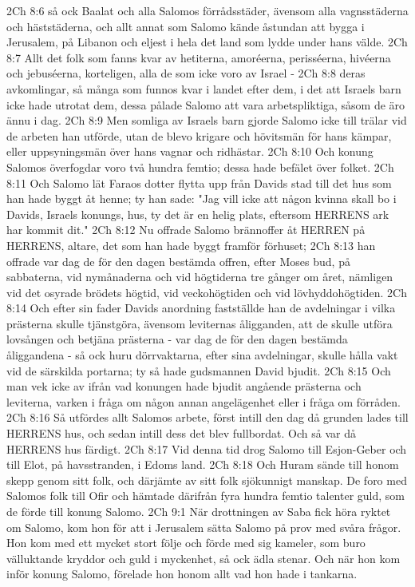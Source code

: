 2Ch 8:6  så ock Baalat och alla Salomos förrådsstäder, ävensom alla vagnsstäderna och häststäderna, och allt annat som Salomo kände åstundan att bygga i Jerusalem, på Libanon och eljest i hela det land som lydde under hans välde.
2Ch 8:7  Allt det folk som fanns kvar av hetiterna, amoréerna, perisséerna, hivéerna och jebuséerna, korteligen, alla de som icke voro av Israel -
2Ch 8:8  deras avkomlingar, så många som funnos kvar i landet efter dem, i det att Israels barn icke hade utrotat dem, dessa pålade Salomo att vara arbetspliktiga, såsom de äro ännu i dag.
2Ch 8:9  Men somliga av Israels barn gjorde Salomo icke till trälar vid de arbeten han utförde, utan de blevo krigare och hövitsmän för hans kämpar, eller uppsyningsmän över hans vagnar och ridhästar.
2Ch 8:10  Och konung Salomos överfogdar voro två hundra femtio; dessa hade befälet över folket.
2Ch 8:11  Och Salomo lät Faraos dotter flytta upp från Davids stad till det hus som han hade byggt åt henne; ty han sade: "Jag vill icke att någon kvinna skall bo i Davids, Israels konungs, hus, ty det är en helig plats, eftersom HERRENS ark har kommit dit."
2Ch 8:12  Nu offrade Salomo brännoffer åt HERREN på HERRENS, altare, det som han hade byggt framför förhuset;
2Ch 8:13  han offrade var dag de för den dagen bestämda offren, efter Moses bud, på sabbaterna, vid nymånaderna och vid högtiderna tre gånger om året, nämligen vid det osyrade brödets högtid, vid veckohögtiden och vid lövhyddohögtiden.
2Ch 8:14  Och efter sin fader Davids anordning fastställde han de avdelningar i vilka prästerna skulle tjänstgöra, ävensom leviternas åligganden, att de skulle utföra lovsången och betjäna prästerna - var dag de för den dagen bestämda åliggandena - så ock huru dörrvaktarna, efter sina avdelningar, skulle hålla vakt vid de särskilda portarna; ty så hade gudsmannen David bjudit.
2Ch 8:15  Och man vek icke av ifrån vad konungen hade bjudit angående prästerna och leviterna, varken i fråga om någon annan angelägenhet eller i fråga om förråden.
2Ch 8:16  Så utfördes allt Salomos arbete, först intill den dag då grunden lades till HERRENS hus, och sedan intill dess det blev fullbordat. Och så var då HERRENS hus färdigt.
2Ch 8:17  Vid denna tid drog Salomo till Esjon-Geber och till Elot, på havsstranden, i Edoms land.
2Ch 8:18  Och Huram sände till honom skepp genom sitt folk, och därjämte av sitt folk sjökunnigt manskap. De foro med Salomos folk till Ofir och hämtade därifrån fyra hundra femtio talenter guld, som de förde till konung Salomo.
2Ch 9:1  När drottningen av Saba fick höra ryktet om Salomo, kom hon för att i Jerusalem sätta Salomo på prov med svåra frågor. Hon kom med ett mycket stort följe och förde med sig kameler, som buro välluktande kryddor och guld i myckenhet, så ock ädla stenar. Och när hon kom inför konung Salomo, förelade hon honom allt vad hon hade i tankarna.
